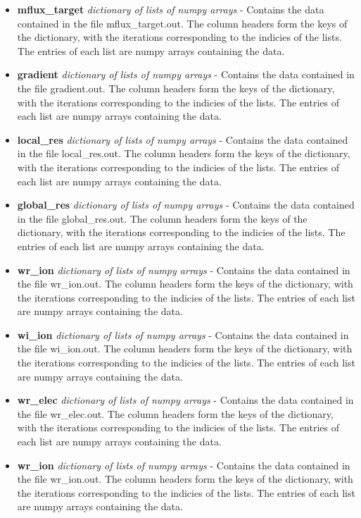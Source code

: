 \documentclass{article}
\begin{document}
\begin{itemize}
\begin{itemize}
\item \textbf{mflux\_target} \emph{dictionary of lists of numpy arrays} - Contains the data contained in the file mflux\_target.out.  The column headers form the keys of the dictionary, with the iterations corresponding to the indicies of the lists.  The entries of each list are numpy arrays containing the data.
\item \textbf{gradient} \emph{dictionary of lists of numpy arrays} - Contains the data contained in the file gradient.out.  The column headers form the keys of the dictionary, with the iterations corresponding to the indicies of the lists.  The entries of each list are numpy arrays containing the data.
\item \textbf{local\_res} \emph{dictionary of lists of numpy arrays} - Contains the data contained in the file local\_res.out.  The column headers form the keys of the dictionary, with the iterations corresponding to the indicies of the lists.  The entries of each list are numpy arrays containing the data.
\item \textbf{global\_res} \emph{dictionary of lists of numpy arrays} - Contains the data contained in the file global\_res.out.  The column headers form the keys of the dictionary, with the iterations corresponding to the indicies of the lists.  The entries of each list are numpy arrays containing the data.
\item \textbf{wr\_ion} \emph{dictionary of lists of numpy arrays} - Contains the data contained in the file wr\_ion.out.  The column headers form the keys of the dictionary, with the iterations corresponding to the indicies of the lists.  The entries of each list are numpy arrays containing the data.
\item \textbf{wi\_ion} \emph{dictionary of lists of numpy arrays} - Contains the data contained in the file wi\_ion.out.  The column headers form the keys of the dictionary, with the iterations corresponding to the indicies of the lists.  The entries of each list are numpy arrays containing the data.
\item \textbf{wr\_elec} \emph{dictionary of lists of numpy arrays} - Contains the data contained in the file wr\_elec.out.  The column headers form the keys of the dictionary, with the iterations corresponding to the indicies of the lists.  The entries of each list are numpy arrays containing the data.
\item \textbf{wr\_ion} \emph{dictionary of lists of numpy arrays} - Contains the data contained in the file wr\_ion.out.  The column headers form the keys of the dictionary, with the iterations corresponding to the indicies of the lists.  The entries of each list are numpy arrays containing the data.

\end{itemize}
\end{itemize}
\end{document}

